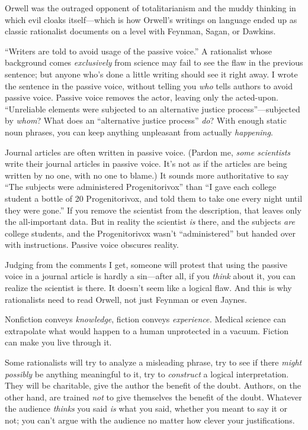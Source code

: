 {
 Orwell was the outraged opponent of totalitarianism and the muddy
thinking in which evil cloaks itself---which is how
Orwell's writings on language ended up as classic
rationalist documents on a level with Feynman, Sagan, or Dawkins.}

{
 ``Writers are told to avoid usage of the passive
voice.'' A rationalist whose background comes
\textit{exclusively} from science may fail to see the flaw in the
previous sentence; but anyone who's done a little
writing should see it right away. I wrote the sentence in the passive
voice, without telling you \textit{who} tells authors to avoid passive
voice. Passive voice removes the actor, leaving only the acted-upon.
``Unreliable elements were subjected to an alternative
justice process''---subjected by \textit{whom}? What
does an ``alternative justice
process'' \textit{do}? With enough static noun
phrases, you can keep anything unpleasant from actually
\textit{happening}.}

{
 Journal articles are often written in passive voice. (Pardon me,
\textit{some scientists} write their journal articles in passive voice.
It's not as if the articles are being written by no
one, with no one to blame.) It sounds more authoritative to say
``The subjects were administered
Progenitorivox'' than ``I gave each
college student a bottle of 20 Progenitorivox, and told them to take
one every night until they were gone.'' If you remove
the scientist from the description, that leaves only the all-important
data. But in reality the scientist \textit{is} there, and the subjects
\textit{are} college students, and the Progenitorivox
wasn't
``administered'' but handed over
with instructions. Passive voice obscures reality.}

{
 Judging from the comments I get, someone will protest that using
the passive voice in a journal article is hardly a sin---after all, if
you \textit{think} about it, you can realize the scientist is there. It
doesn't seem like a logical flaw. And this is why
rationalists need to read Orwell, not just Feynman or even Jaynes.}

{
 Nonfiction conveys \textit{knowledge}, fiction conveys
\textit{experience.} Medical science can extrapolate what would happen
to a human unprotected in a vacuum. Fiction can make you live through
it.}

{
 Some rationalists will try to analyze a misleading phrase, try to
see if there \textit{might possibly} be anything meaningful to it, try
to \textit{construct} a logical interpretation. They will be
charitable, give the author the benefit of the doubt. Authors, on the
other hand, are trained \textit{not} to give themselves the benefit of
the doubt. Whatever the audience \textit{thinks} you said \textit{is}
what you said, whether you meant to say it or not; you
can't argue with the audience no matter how clever your
justifications.}

